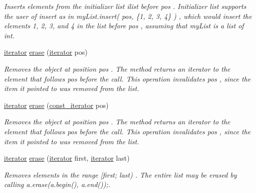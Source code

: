\begin{DoxyCompactItemize}
\begin{DoxyCompactList}\small\item\em Inserts elements from the initializer list ilist before pos . Initializer list supports the user of insert as in my\+List.\+insert( pos, \{1, 2, 3, 4\} ) , which would insert the elements 1, 2, 3, and 4 in the list before pos , assuming that my\+List is a list of int. \end{DoxyCompactList}\item 
\mbox{\label{classls_1_1list_a76b6efa016395fd031baa05d63ebc745}} 
\hyperlink{classls_1_1list_af036cf72da26107a5084c1e4b45b9cb7}{iterator} \hyperlink{classls_1_1list_a76b6efa016395fd031baa05d63ebc745}{erase} (\hyperlink{classls_1_1list_af036cf72da26107a5084c1e4b45b9cb7}{iterator} pos)
\begin{DoxyCompactList}\small\item\em Removes the object at position pos . The method returns an iterator to the element that follows pos before the call. This operation invalidates pos , since the item it pointed to was removed from the list. \end{DoxyCompactList}\item 
\mbox{\label{classls_1_1list_ae616e00db8cc2bd8641baf06cdbd99ab}} 
\hyperlink{classls_1_1list_af036cf72da26107a5084c1e4b45b9cb7}{iterator} \hyperlink{classls_1_1list_ae616e00db8cc2bd8641baf06cdbd99ab}{erase} (\hyperlink{classls_1_1list_ad543276e86075caadf97ae64f2fc7cfc}{const\+\_\+iterator} pos)
\begin{DoxyCompactList}\small\item\em Removes the object at position pos . The method returns an iterator to the element that follows pos before the call. This operation invalidates pos , since the item it pointed to was removed from the list. \end{DoxyCompactList}\item 
\mbox{\label{classls_1_1list_a6f144b35d56b9bcf88ef8f21ca9aef54}} 
\hyperlink{classls_1_1list_af036cf72da26107a5084c1e4b45b9cb7}{iterator} \hyperlink{classls_1_1list_a6f144b35d56b9bcf88ef8f21ca9aef54}{erase} (\hyperlink{classls_1_1list_af036cf72da26107a5084c1e4b45b9cb7}{iterator} first, \hyperlink{classls_1_1list_af036cf72da26107a5084c1e4b45b9cb7}{iterator} last)
\begin{DoxyCompactList}\small\item\em Removes elements in the range \mbox{[}first; last) . The entire list may be erased by calling a.\+erase(a.\+begin(), a.\+end());. \end{DoxyCompactList}\item 

\end{DoxyCompactItemize}
